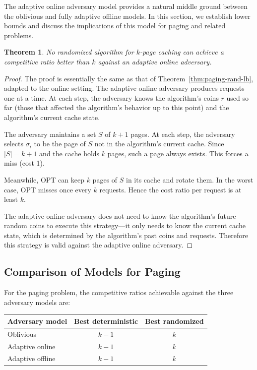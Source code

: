 \documentclass[twoside,12pt]{book}
\theoremstyle{plain}
\newtheorem{theorem}{Theorem}[chapter]
\theoremstyle{definition}
\theoremstyle{remark}
\begin{document}
The adaptive online adversary model provides a natural middle ground
between the oblivious and fully adaptive offline models.  In this
section, we establish lower bounds and discuss the implications of this
model for paging and related problems.

\begin{theorem}\label{thm:adaptive-online-lb}
No randomized algorithm for $k$-page caching can achieve a competitive
ratio better than $k$ against an adaptive online adversary.
\end{theorem}

\begin{proof}
The proof is essentially the same as that of
Theorem~\ref{thm:paging-rand-lb}, adapted to the online setting.  The
adaptive online adversary produces requests one at a time.  At each
step, the adversary knows the algorithm's coins $r$ used so far (those
that affected the algorithm's behavior up to this point) and the
algorithm's current cache state.

The adversary maintains a set $S$ of $k+1$ pages.  At each step, the
adversary selects $\sigma_i$ to be the page of $S$ not in the
algorithm's current cache.  Since $|S| = k+1$ and the cache holds $k$
pages, such a page always exists.  This forces a miss (cost 1).

Meanwhile, OPT can keep $k$ pages of $S$ in its cache and rotate them.
In the worst case, OPT misses once every $k$ requests.  Hence the
cost ratio per request is at least $k$.

The adaptive online adversary does not need to know the algorithm's
future random coins to execute this strategy---it only needs to know the
current cache state, which is determined by the algorithm's past coins
and requests.  Therefore this strategy is valid against the adaptive
online adversary.
\end{proof}

\subsection{Comparison of Models for Paging}

For the paging problem, the competitive ratios achievable against the
three adversary models are:

\begin{center}
\begin{tabular}{lcc}
\toprule
\textbf{Adversary model} & \textbf{Best deterministic} & \textbf{Best randomized} \\
\midrule
Oblivious          & $k-1$ & $k$ \\
Adaptive online    & $k-1$ & $k$ \\
Adaptive offline   & $k-1$ & $k$ \\
\bottomrule
\end{tabular}
\end{center}
\end{document}
